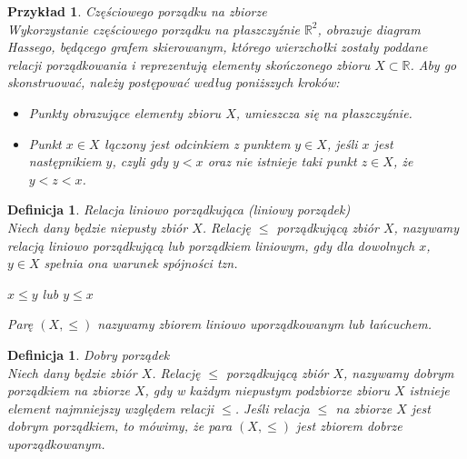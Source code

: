 \documentclass[12pt,a4paper]{report}
\newtheorem{definition}[theorem]{Definicja}
\newtheorem{example}{Przykład}
\begin{document}
\begin{example}{Częściowego porządku na zbiorze\\}
Wykorzystanie częściowego porządku na płaszczyźnie $\mathbb{R}^2$, obrazuje diagram Hassego, będącego grafem skierowanym, którego wierzchołki zostały poddane relacji porządkowania i reprezentują elementy  skończonego zbioru $X \subset \mathbb{R}$. 
Aby go skonstruować, należy postępować według poniższych kroków:
\begin{itemize}
\item Punkty obrazujące elementy zbioru $X$, umieszcza się na płaszczyźnie.
\item Punkt $x\in X$ łączony jest odcinkiem z punktem $y \in X$, jeśli $x$ jest następnikiem $y$, czyli gdy $y <x$ oraz nie istnieje taki punkt $z \in X$, że $y<z<x$.
\end{itemize}
\end{example}


\begin{definition}{Relacja liniowo porządkująca (liniowy porządek) \cite[Rozdział 2]{blaszczyk2007}\\}\label{def-porzadek-liniowy}
Niech dany będzie niepusty zbiór $X$. Relację $\leq$ porządkującą zbiór $X$, nazywamy relacją liniowo porządkującą lub porządkiem liniowym, gdy dla dowolnych $x$, $y \in X$ spełnia ona warunek spójności tzn.
\begin{center}
$x \leq y$ lub $y \leq x$
\end{center}
Parę $(X, \leq)$ nazywamy zbiorem liniowo uporządkowanym lub łańcuchem.\\
\end{definition}

\begin{definition}{Dobry porządek \cite[Rozdział 2]{blaszczyk2007}\\}
Niech dany będzie zbiór $X$. Relację $\leq$ porządkującą zbiór $X$, nazywamy dobrym porządkiem na zbiorze $X$, gdy w każdym niepustym podzbiorze zbioru $X$ istnieje element najmniejszy względem relacji $\leq$. Jeśli relacja $\leq$ na zbiorze $X$ jest dobrym porządkiem, to mówimy, że para $(X,\leq)$ jest zbiorem dobrze uporządkowanym.\\
\end{definition}
\end{document}
